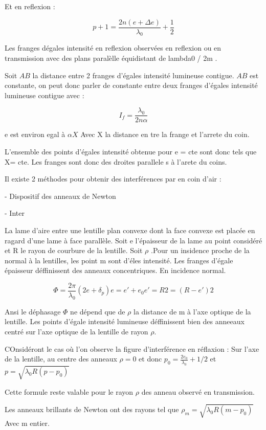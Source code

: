 \documentclass[a4paper,12pt]{article}
\theoremstyle{StyleTheo_will}
\theoremstyle{remark}
\begin{document}
Et en reflexion : 

\[ p+1 = \frac{2n(e+\Delta e)}{\lambda_0} +\frac{1}{2}\]



Les franges dégales intensité en reflexion observées en reflexion ou en transmission avec des plans paralèlle équidistant de lambda0 / 2m .

Soit $AB$ la distance entre 2 franges d'égales intensité lumineuse contigue. $AB$ est constante, on peut donc parler de constante entre deux franges d'égales intensité lumineuse contigue avec : 

 \[I_f = \frac{\lambda_0}{2n\alpha}\]
 
  e est environ egal à $\alpha X$ Avec X la distance en tre la frange et l'arrete du coin.

L'ensemble des points d'égales intensité obtenue pour e = cte sont donc tels que X= cte. Les franges sont donc des droites parallele s à l'arete du coins.

Il existe 2 méthodes pour obtenir des interférences par en coin d'air :

- Dispositif des anneaux de Newton

- Inter

La lame d'aire entre une lentille plan convexe dont la face convexe est placée en ragard d'une lame à face parallèle. 
Soit e l'épaisseur de la lame au point considéré et R le rayon de courbure de la lentille. Soit $\rho$ .Pour un insidence proche de la normal à la lentilles, les point m sont d'éles intensité. Les franges d'égale épaisseur déffinissent des anneaux concentriques. En incidence normal.%

\[
\Phi = \frac{2\pi}{\lambda_0}(2e+\delta_p)
e = e' + e_0
e'= 
R2 =(R-e')2
\]

Ansi le déphasage $\Phi$ ne dépend que de $\rho$ la distance de m à l'axe optique de la lentille. Les points d'égale intensité lumineuse déffinissent bien des anneeaux centré sur l'axe optique de la lentille de rayon $\rho$.

COnsidéront le cas où l'on observe la figure d'interférence en réflaxion : Sur l'axe de la lentille, au centre des anneaux $\rho = 0$ et donc $p_0= \frac{2e_0}{\lambda_0} + 1/2$ et $p = \sqrt{\lambda_0 R (p-p_0)}$

Cette formule reste valable pour le rayon $\rho$ des anneau observé en transmission.

Les anneaux brillants de Newton ont des rayons tel que $\rho_m = \sqrt{\lambda_0 R(m-p_0)} $ Avec m entier.
\end{document}
